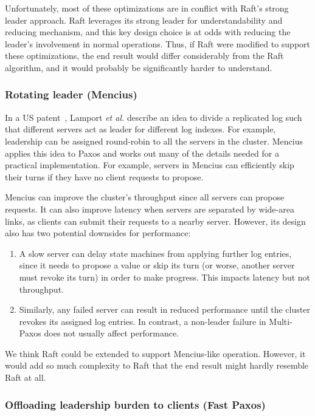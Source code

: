 Unfortunately, most of these optimizations are in conflict with Raft's
strong leader approach. Raft leverages its strong leader for
understandability and reducing mechanism, and this key design choice is
at odds with reducing the leader's involvement in normal operations.
Thus, if Raft were modified to support these optimizations, the
end result would differ considerably from the Raft algorithm, and it
would probably be significantly harder to understand.

\subsubsection{Rotating leader (Mencius)}


In a US patent~\cite{Lamport:2007}, Lamport \emph{et al.} describe an
idea to divide a replicated log such that different servers act as
leader for different log indexes. For example, leadership can be
assigned round-robin to all the servers in the cluster.
Mencius~\cite{Mao:2008} applies this idea to Paxos and works out many of
the details needed for a practical implementation. For example, servers in
Mencius can efficiently skip their turns if they have no client requests
to propose.

Mencius can improve the cluster's throughput since all servers can
propose requests. It can also improve latency when servers are separated
by wide-area links, as clients can submit their requests to a nearby
server. However, its design also has two potential downsides for
performance:
%
\begin{enumerate}
%
\item A slow server can delay state machines from applying further log
entries, since it needs to propose a value or skip its turn (or worse,
another server must revoke its turn) in order to make progress. This
impacts latency but not throughput.
%
\item Similarly, any failed server can result in reduced performance
until the cluster revokes its assigned log entries. In
contrast, a non-leader failure in Multi-Paxos does not usually affect
performance.
%
\end{enumerate}

We think Raft could be extended to support Mencius-like operation.
However, it would add so much complexity to Raft that the end result
might hardly resemble Raft at all.


\subsubsection{Offloading leadership burden to clients (Fast Paxos)}

